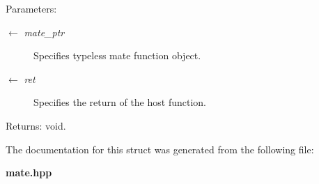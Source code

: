 \begin{Desc}
\item[Parameters:]
\begin{description}
\item[\mbox{$\leftarrow$} {\em mate\_\-ptr}]Specifies typeless mate function object. \item[\mbox{$\leftarrow$} {\em ret}]Specifies the return of the host function. \end{description}
\end{Desc}
\begin{Desc}
\item[Returns:]void. \end{Desc}


The documentation for this struct was generated from the following file:\begin{CompactItemize}
\item 
{\bf mate.hpp}\end{CompactItemize}
